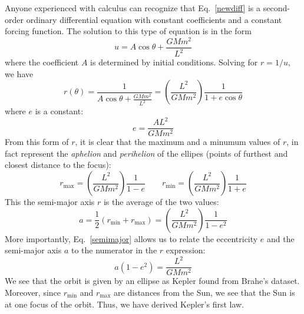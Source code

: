 \documentclass[11pt]{article}
\begin{document}
Anyone experienced with calculus can recognize that Eq.\ \ref{newdiff} is a
second-order ordinary differential equation with constant coefficients and a
constant forcing function. The solution to this type of equation is in the form
\begin{equation}
  u =A\cos\theta + \frac{GMm^2}{L^2}
\end{equation}
where the coefficient $A$ is determined by initial conditions. Solving for
$r=1/u$, we have
\begin{equation}
  r(\theta)= \frac{1}{A\cos\theta+ \frac{GMm^2}{L^2}}
  =\left(\frac{L^2}{GMm^2}\right)\frac{1}{1+e\cos\theta}
\end{equation}
where $e$ is a constant:
\begin{equation}
  e=\dfrac{AL^2}{GMm^2}
\end{equation}
From this form of $r$, it is clear that the maximum and a minumum values of
$r$, in fact represent the \emph{aphelion} and \emph{perihelion} of the
ellipes (points of furthest and closest distance to the focus):
\begin{equation}
  r_{\textrm{max}}=\left(\frac{L^2}{GMm^2}\right)\frac{1}{1-e}
  \quad\quad
  r_{\textrm{min}}=\left(\frac{L^2}{GMm^2}\right)\frac{1}{1+e}
\end{equation}
This the semi-major axis $r$ is the average of the two values:
\begin{equation}
  a=\dfrac12\left(r_\text{min} + r_\text{max}\right)=
  \left(\frac{L^2}{GMm^2}\right)\frac{1}{1-e^2}
  \label{semimajor}
\end{equation}
More importantly, Eq.\ \ref{semimajor} allows us to relate the eccentricity
$e$ and the semi-major axis $a$ to the numerator in the $r$ expression:
\begin{equation}
  a(1-e^2)=\frac{L^2}{GMm^2}
  \label{eq:numerator}
\end{equation}
We see that the orbit is given by an ellipse as Kepler found from Brahe's
dataset. Moreover, since $r_\mathrm{min}$ and $r_\mathrm{max}$ are distances from
the Sun, we see that the Sun is at one focus of the orbit. Thus, we have
derived Kepler's first law.

%
\end{document}
